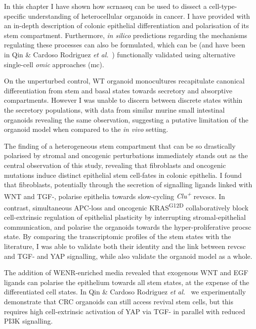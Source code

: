 In this chapter I have shown how \acrshort{scrnaseq} can be used to dissect a cell-type-specific understanding of heterocellular organoids in cancer. I have provided with an in-depth description of colonic epithelial differentiation and polarisation of its stem compartment. Furthermore, \emph{in silico} predictions regarding the mechanisms regulating these processes can also be formulated, which can be (and have been in Qin \& Cardoso Rodriguez \emph{et al.}~\cite{cardoso_rodriguez_single-cell_2023}) functionally validated using alternative single-cell \emph{omic} approaches (\acrshort{mc}).

On the unperturbed control, WT organoid monocultures recapitulate canonical differentiation from stem and basal states towards secretory and absorptive compartments. However I was unable to discern between discrete states within the secretory populations, with data from similar murine small intestinal organoids revealing the same observation, suggesting a putative limitation of the organoid model when compared to the \emph{in vivo} setting.

The finding of a heterogeneous stem compartment that can be so drastically polarised by stromal and oncogenic perturbations immediately stands out as the central observation of this study, revealing that fibroblasts and oncogenic mutations induce distinct epithelial stem cell-fates in colonic epithelia. I found that fibroblasts, potentially through the secretion of signalling ligands linked with WNT and TGF-, polarise epithelia towards slow-cycling \textit{Clu\textsuperscript{+}} \acrshort{revcsc}s. In contrast, simultaneous APC-loss and oncogenic KRAS\textsuperscript{G12D} collaboratively block cell-extrinsic regulation of epithelial plasticity by interrupting stromal-epithelial communication, and polarise the organoids towards the hyper-proliferative \acrshort{procsc} state. By comparing the transcriptomic profiles of the stem states with the literature, I was able to validate both their identity and the link between \acrshort{revcsc} and TGF- and YAP signalling, while also validate the organoid model as a whole.

The addition of WENR-enriched media revealed that exogenous WNT and EGF ligands can polarise the epithelium towards all stem states, at the expense of the differentiated cell states. In Qin \& Cardoso Rodriguez \emph{et al.}~\cite{cardoso_rodriguez_single-cell_2023} we experimentally demonstrate that CRC organoids can still access revival stem cells, but this requires high cell-extrinsic activation of YAP via TGF- in parallel with reduced PI3K signalling. 

